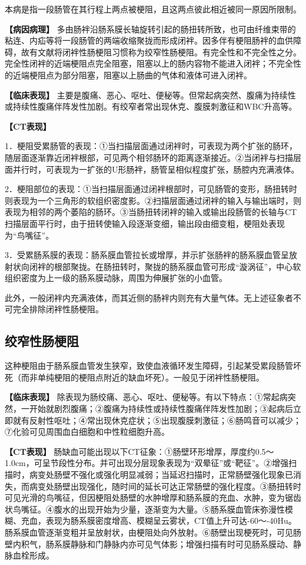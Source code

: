 本病是指一段肠管在其行程上两点被梗阻，且这两点彼此相近被同一原因所限制。

\textbf{【病因病理】}
多由肠袢沿肠系膜长轴旋转引起的肠扭转所致，也可由纤维束带的粘连、内疝等将一段肠管的两端收缩聚拢而形成闭袢。因多伴有梗阻肠袢的血供障碍，故有文献将闭袢性肠梗阻习惯称为绞窄性肠梗阻。有完全性和不完全性之分。完全性闭袢的近端梗阻点完全阻塞，阻塞以上的肠内容物不能进入闭袢；不完全性的近端梗阻点为部分阻塞，阻塞以上肠曲的气体和液体可进入闭袢。

\textbf{【临床表现】}
主要是腹痛、恶心、呕吐、便秘等。但常起病突然、腹痛为持续性或持续性腹痛伴阵发性加剧。有绞窄者常出现休克、腹膜刺激征和WBC升高等。

\textbf{【CT表现】}

1．梗阻受累肠管的表现：①当扫描层面通过闭袢时，可表现为两个扩张的肠环，随层面逐渐靠近闭袢根部，可见两个相邻肠环的距离逐渐接近。②当闭袢与扫描层面并行时，可表现为一扩张的U形肠袢，肠管呈相似程度扩张，肠腔内充满液体。

2．梗阻部位的表现：①当扫描层面通过闭袢根部时，可见肠管的变形，肠扭转时则表现为一个三角形的软组织密度影。②扫描层面通过闭袢的输入与输出端时，则表现为相邻的两个萎陷的肠环。③当肠扭转闭袢的输入或输出段肠管的长轴与CT扫描层面平行时，由于扭转使输入段逐渐变细，输出段由细变粗，梗阻处表现为“鸟嘴征”。

3．受累肠系膜的表现：肠系膜血管拉长或增厚，并示扩张肠袢的肠系膜血管呈放射状向闭袢的根部聚拢。在肠扭转时，聚拢的肠系膜血管可形成“漩涡征”，中心软组织密度为上一级的肠系膜动脉，周围为伸展扩张的小血管。

此外，一般闭袢内充满液体，而其近侧的肠袢内则充有大量气体。无上述征象者不可完全排除闭袢性肠梗阻。

\subsection{绞窄性肠梗阻}

这种梗阻由于肠系膜血管发生狭窄，致使血液循环发生障碍，引起某受累段肠管坏死（而非单纯梗阻的梗阻点附近的缺血坏死）。一般见于闭袢性肠梗阻。

\textbf{【临床表现】}
除表现为肠绞痛、恶心、呕吐、便秘等。有以下特点：①常起病突然，一开始就剧烈腹痛；②腹痛为持续性或持续性腹痛伴阵发性加剧；③起病后立即就有反射性呕吐；④常出现休克症状；⑤出现腹膜刺激征；⑥肠鸣音可以减少；⑦化验可见周围血白细胞和中性粒细胞升高。

\textbf{【CT表现】}
肠缺血可能出现以下CT征象：①肠壁环形增厚，厚度约0.5～1.0cm，可呈节段性分布。并可出现分层现象表现为“双晕征”或“靶征”。②增强扫描时，病变处肠壁不强化或强化明显减弱；当延迟扫描时，正常肠壁强化现象已消失，而病变处肠壁出现强化，随时间的延长可达正常肠壁的强化程度。③肠扭转时可见光滑的鸟嘴征，但因梗阻处肠壁的水肿增厚和肠系膜的充血、水肿，变为锯齿状鸟嘴征。④腹水的出现开始为少量，逐渐变为大量。⑤肠系膜血管床弥漫性模糊、充血，表现为肠系膜密度增高、模糊呈云雾状，CT值上升可达-60～-40Hu。肠系膜血管逐渐变粗并呈放射状，由梗阻处向外放射。⑥肠壁出现梗死时，可见肠壁内积气，肠系膜静脉和门静脉内亦可见气体影；增强扫描有时可见肠系膜动、静脉血栓形成。

